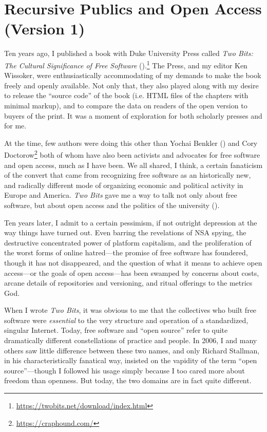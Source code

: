\documentclass[11pt]{article}
\author{Christopher Kelty}
\date{\today}
\title{}
\begin{document}
\section*{Recursive Publics and Open Access (Version 1)}
\label{sec:orgf4144c4}

\maketitle
\onehalfspacing 

Ten years ago, I published a book with Duke University Press called \emph{Two Bits: The Cultural Significance of Free Software} (\cite{kelty2008twobits}).\footnote{\url{https://twobits.net/download/index.html}} The Press, and my editor Ken Wissoker, were enthusiastically accommodating of my demands to make the book freely and openly available.  Not only that, they also played along with my desire to release the ``source code'' of the book (i.e. HTML files of the chapters with minimal markup), and to compare the data on readers of the open version to buyers of the print.  It was a moment of exploration for both scholarly presses and for me. 

At the time, few authors were doing this other than Yochai Benkler (\cite{benkler2007wealnetw}) and Cory Doctorow\footnote{\url{https://craphound.com/}} both of whom have also been activists and advocates for free software and open access, much as I have been.  We all shared, I think, a certain fanaticism of the convert that came from recognizing free software as an historically new, and radically different mode of organizing economic and political activity in Europe and America. \emph{Two Bits} gave me a way to talk not only about free software, but about open access and the politics of the university (\cite{kelty2008anthincirc,kelty2014beyoncopytech}). 

Ten years later, I admit to a certain pessimism, if not outright depression at the way things have turned out.  Even barring the revelations of NSA spying, the destructive concentrated power of platform capitalism, and the proliferation of the worst forms of online hatred---the promise of free software has foundered, though it has not disappeared, and the question of what it means to achieve open access---or the goals of open access---has been swamped by concerns about costs, arcane details of repositories and versioning, and ritual offerings to the metrics God.  

When I wrote \emph{Two Bits}, it was obvious to me that the collectives who built free software were \emph{essential} to the very structure and operation of a standardized, singular Internet. Today, free software and ``open source'' refer to quite dramatically different constellations of practice and people.  In 2006, I and many others saw little difference between these two names, and only Richard Stallman, in his characteristically fanatical way, insisted on the vapidity of the term ``open source''---though I followed his usage simply because I too cared more about freedom than openness.  But today, the two domains are in fact quite different.
\end{document}
